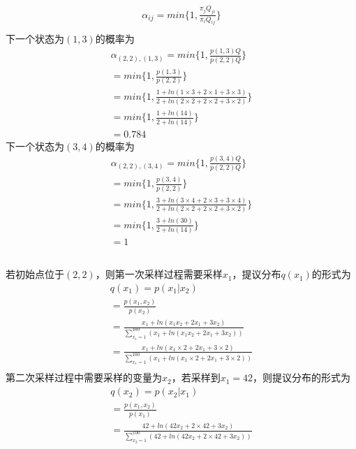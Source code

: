 \documentclass[12pt,a4paper]{article}
\begin{document}
\subsection{}
\begin{gather*}
    \alpha_{ij} = min\{1,\frac{\pi_jQ_{ji}}{\pi_iQ_{ij}}\}\\
\end{gather*}
下一个状态为$(1,3)$的概率为
\begin{gather*}
    \alpha_{(2,2),(1,3)}=min\{1,\frac{p(1,3)Q}{p(2,2)Q}\}\\
    =min\{1,\frac{p(1,3)}{p(2,2)}\}\\
    =min\{1,\frac{1+ln(1\times3+2\times1+3\times3)}{2+ln(2\times2+2\times2+3\times2)}\}\\
    =min\{1,\frac{1+ln(14)}{2+ln(14)}\}\\
    =0.784
\end{gather*}
下一个状态为$(3,4)$的概率为
\begin{gather*}
    \alpha_{(2,2),(3,4)}=min\{1,\frac{p(3,4)Q}{p(2,2)Q}\}\\
    =min\{1,\frac{p(3,4)}{p(2,2)}\}\\
    =min\{1,\frac{3+ln(3\times4+2\times3+3\times4)}{2+ln(2\times2+2\times2+3\times2)}\}\\
    =min\{1,\frac{3+ln(30)}{2+ln(14)}\}\\
    =1
\end{gather*}
\subsection{}
若初始点位于$(2,2)$，则第一次采样过程需要采样$x_1$，提议分布$q(x_1)$的形式为
\begin{gather*}
    q(x_1)=p(x_1|x_2)\\
    =\frac{p(x_1,x_2)}{p(x_2)}\\
    =\frac{x_1+ln(x_1x_2+2x_1+3x_2)}{\sum_{x_1=1}^{100}(x_1+ln(x_1x_2+2x_1+3x_2))}\\
    =\frac{x_1+ln(x_1\times2+2x_1+3\times2)}{\sum_{x_1=1}^{100}(x_1+ln(x_1\times2+2x_1+3\times2))}\\
\end{gather*}
第二次采样过程中需要采样的变量为$x_2$，若采样到$x_1 = 42$，则提议分布的形式为
\begin{gather*}
    q(x_2)=p(x_2|x_1)\\
    =\frac{p(x_1,x_2)}{p(x_1)}\\
    =\frac{42+ln(42x_2+2\times42+3x_2)}{\sum_{x_2=1}^{100}(42+ln(42x_2+2\times42+3x_2))}\\
\end{gather*}
\end{document}
